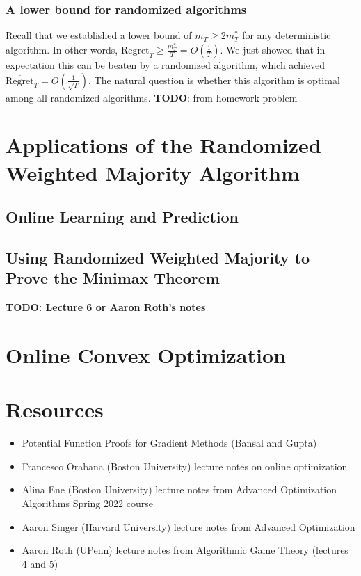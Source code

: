 \documentclass[12pt]{article}
\begin{document}
\subsubsection{A lower bound for randomized algorithms}
Recall that we established a lower bound of $m_T \geq 2m_T^*$ for any deterministic algorithm. In other words, $\overline{\text{Regret}}_T \geq \frac{m_T^*}{T} = O\left(\frac{1}{T}\right)$.
We just showed that in expectation this can be beaten by 
a randomized algorithm, which achieved $\overline{\text{Regret}}_T = O\left(\frac{1}{\sqrt{T}}\right)$. The natural question is whether this algorithm is optimal among all randomized 
algorithms. 
\textbf{TODO}: from homework problem 

\section{Applications of the Randomized Weighted Majority Algorithm}


\subsection{Online Learning and Prediction}


\subsection{Using Randomized Weighted Majority to Prove the Minimax Theorem}
\textbf{TODO: Lecture 6 or Aaron Roth's notes}


\section{Online Convex Optimization}






\section{Resources}
\begin{itemize}
\item Potential Function Proofs for Gradient Methods (Bansal and Gupta) 
\item Francesco Orabana (Boston University) lecture notes on online optimization
\item Alina Ene (Boston University) lecture notes from Advanced Optimization Algorithms Spring 2022 course
\item Aaron Singer (Harvard University) lecture notes from Advanced Optimization
\item Aaron Roth (UPenn) lecture notes from Algorithmic Game Theory (lectures 4 and 5)
\end{itemize}
\end{document}
